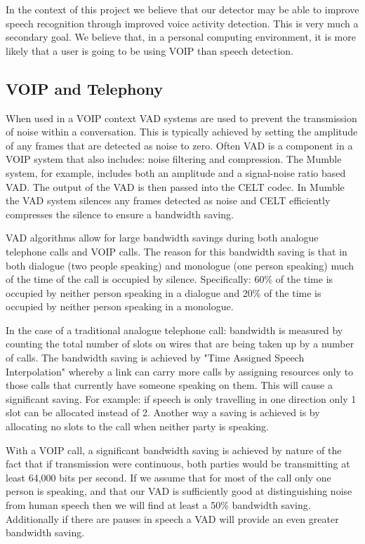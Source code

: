 \documentclass[ %
                    author={Sam Phippen},
                supervisor={Dr. Rafal Bogacz},
                     title={Real time voice activity detectors in noisy personal computing environments},
                  subtitle={},
                    degree={MEng},
                      year={2012} ]{thesis}
\begin{document}
In the context of this project we believe that our detector may be able to
improve speech recognition through improved voice activity detection. This is
very much a secondary goal. We believe that, in a personal computing
environment, it is more likely that a user is going to be using VOIP than
speech detection.

\subsection{VOIP and Telephony}

When used in a VOIP context VAD systems are used to prevent the transmission of
noise within a conversation. This is typically achieved by setting the
amplitude of any frames that are detected as noise to zero. Often VAD is a
component in a VOIP system that also includes: noise filtering and compression.
The Mumble\cite{mumble} system, for example, includes both an amplitude and a
signal-noise ratio based VAD. The output of the VAD is then passed into the
CELT\cite{celt} codec. In Mumble the VAD system silences any frames detected as
noise and CELT efficiently compresses the silence to ensure a bandwidth saving.

VAD algorithms allow for large bandwidth savings during both analogue
telephone calls and VOIP calls. The reason for this bandwidth saving is that in
both dialogue (two people speaking) and monologue (one person speaking) much of
the time of the call is occupied by silence. Specifically: 60\% of the time is
occupied by neither person speaking\cite{shah} in a dialogue and 20\% of the
time is occupied by neither person speaking in a monologue.

In the case of a traditional analogue telephone call: bandwidth is measured by
counting the total number of slots on wires that are being taken up by a number
of calls. The bandwidth saving is achieved by "Time Assigned Speech
Interpolation" whereby a link can carry more calls by assigning resources only
to those calls that currently have someone speaking on them. This will cause a
significant saving. For example: if speech is only travelling in one direction
only 1 slot can be allocated instead of 2. Another way a saving is achieved is
by allocating no slots to the call when neither party is
speaking\cite{5016247}.

With a VOIP call, a significant bandwidth saving is achieved by nature of the
fact that if transmission were continuous, both parties would be transmitting
at least 64,000 bits per second\cite{ciscovad}. If we assume that for most of
the call only one person is speaking, and that our VAD is sufficiently good at
distinguishing noise from human speech then we will find at least a 50\%
bandwidth saving. Additionally if there are pauses in speech a VAD will
provide an even greater bandwidth saving.
\end{document}

